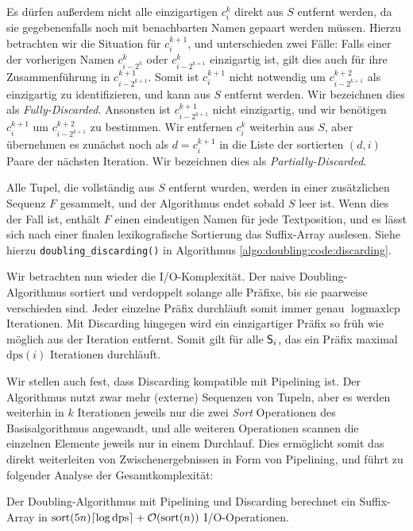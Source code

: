 Es dürfen außerdem nicht alle einzigartigen $c_i^k$ direkt aus $S$ entfernt werden, da sie gegebenenfalls noch mit benachbarten Namen gepaart werden müssen. Hierzu betrachten wir die Situation für $c_i^{k+1}$, und unterschieden zwei Fälle: Falls einer der vorherigen Namen $c_{i - 2^k}^k$ oder $c_{i - 2^{k+1}}^k$ einzigartig ist, gilt dies auch für ihre Zusammenführung in $c_{i - 2^{k+1}}^{k+1}$. Somit ist $c_i^{k+1}$ nicht notwendig um $c_{i - 2^{k+1}}^{k+2}$ als einzigartig zu identifizieren, und kann aus $S$ entfernt werden. Wir bezeichnen dies als \textit{Fully-Discarded}. Ansonsten ist $c_{i - 2^{k+1}}^{k+1}$ nicht einzigartig, und wir benötigen $c_i^{k+1}$ um $c_{i - 2^{k+1}}^{k+2}$ zu bestimmen. Wir entfernen $c_i^k$ weiterhin aus $S$, aber übernehmen es zunächst noch als $d = c_i^{k+1}$ in die Liste der sortierten $(d, i)$ Paare der nächsten Iteration. Wir bezeichnen dies als \textit{Partially-Discarded}.

Alle Tupel, die vollständig aus $S$ entfernt wurden, werden in einer zusätzlichen Sequenz $F$ gesammelt, und der Algorithmus endet sobald $S$ leer ist. Wenn dies der Fall ist, enthält $F$ einen eindeutigen Namen für jede Textposition, und es lässt sich nach einer finalen lexikografische Sortierung das Suffix-Array auslesen. Siehe hierzu \texttt{doubling\_discarding()} in Algorithmus \ref{algo:doubling:code:discarding}.

Wir betrachten nun wieder die I/O-Komplexität. Der naive Doubling-Algorithmus sortiert und verdoppelt solange alle Präfixe, bis sie paarweise verschieden sind. Jeder einzelne Präfix durchläuft somit immer genau $\log \text{maxlcp}$ Iterationen. Mit Discarding hingegen wird ein einzigartiger Präfix so früh wie möglich aus der Iteration entfernt. Somit gilt für alle $\mathsf{S}_{i}$, das ein Präfix maximal $\text{dps}(i)$ Iterationen durchläuft.

Wir stellen auch fest, dass Discarding kompatible mit Pipelining ist. Der Algorithmus nutzt zwar mehr (externe) Sequenzen von Tupeln, aber es werden weiterhin in $k$ Iterationen jeweils nur die zwei \textit{Sort} Operationen des Basisalgorithmus angewandt, und alle weiteren Operationen scannen die einzelnen Elemente jeweils nur in einem Durchlauf. Dies ermöglicht somit das direkt weiterleiten von Zwischenergebnissen in Form von Pipelining, und führt zu folgender Analyse der Gesamtkomplexität:

\begin{theorem}
Der Doubling-Algorithmus mit Pipelining und Discarding berechnet ein Suffix-Array in $\text{sort}(5n) \ceil*{\log \text{dps}} +  \mathcal{O}(\text{sort}(n))$ I/O-Operationen.
\end{theorem}

